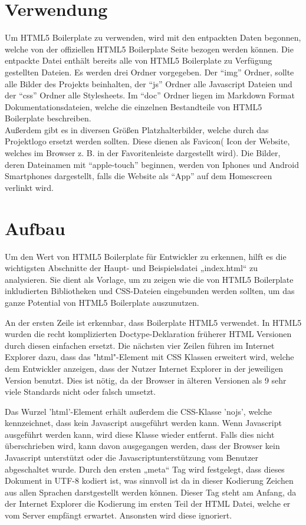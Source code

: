 \documentclass[12pt,journal,compsoc]{IEEEtran}
\begin{document}
\section{Verwendung}
Um HTML5 Boilerplate zu verwenden, wird mit den entpackten Daten begonnen, welche von der offiziellen HTML5 Boilerplate Seite bezogen werden können.\cite{boiler}
Die entpackte Datei enthält bereits alle von HTML5 Boilerplate zu Verfügung gestellten Dateien.
Es werden drei Ordner vorgegeben. Der “img” Ordner, sollte alle Bilder des Projekts beinhalten, der “js” Ordner alle Javascript Dateien
und der “css” Ordner alle Stylesheets. Im “doc” Ordner liegen im Markdown Format\cite{markdown} Dokumentationsdateien, welche die einzelnen Bestandteile von HTML5 Boilerplate beschreiben.
\\ Außerdem gibt es in diversen Größen Platzhalterbilder, welche durch das Projektlogo ersetzt werden sollten.
Diese dienen als Favicon( Icon der Website, welches im Browser z. B. in der Favoritenleiste dargestellt wird).
Die Bilder, deren Dateinamen mit “apple-touch” beginnen, werden von Iphones und Android Smartphones dargestellt, falls die Website als “App” auf dem Homescreen verlinkt wird.


\section{Aufbau}

Um den Wert von HTML5 Boilerplate für Entwickler zu erkennen, hilft es die wichtigsten Abschnitte der Haupt- und Beispielsdatei „index.html“\cite{index} zu analysieren. 
Sie dient als Vorlage, um zu zeigen wie die von HTML5 Boilerplate inkludierten Bibliotheken und CSS-Dateien eingebunden werden sollten,
um das ganze Potential von HTML5 Boilerplate auszunutzen.


An der ersten Zeile ist erkennbar, dass Boilerplate HTML5 verwendet. In HTML5 wurden die recht komplizierten Doctype-Deklaration früherer 
HTML Versionen durch diesen einfachen ersetzt. Die nächsten vier Zeilen führen im Internet Explorer dazu, dass das "html"-Element mit CSS Klassen erweitert wird,
welche dem Entwickler anzeigen, dass der Nutzer Internet Explorer in der jeweiligen Version benutzt.
Dies ist nötig, da der Browser in älteren Versionen als 9 sehr viele Standards nicht oder falsch umsetzt.\cite{iefx}

Das Wurzel 'html'-Element erhält außerdem die CSS-Klasse 'nojs', welche kennzeichnet, dass kein Javascript ausgeführt werden kann. Wenn Javascript ausgeführt werden kann, wird diese Klasse wieder entfernt.
Falls dies nicht überschrieben wird, kann davon ausgegangen werden, dass der Browser kein Javascript unterstützt oder die Javascriptunterstützung vom Benutzer abgeschaltet wurde.
Durch den ersten „meta“ Tag wird festgelegt, dass dieses Dokument in UTF-8 kodiert ist,
was sinnvoll ist da in dieser Kodierung Zeichen aus allen Sprachen darstgestellt werden können. Dieser Tag steht am Anfang, da der Internet Explorer die Kodierung im ersten Teil der HTML Datei, welche er vom Server empfängt erwartet. Ansonsten wird diese ignoriert. \cite{iebug}
\end{document}
